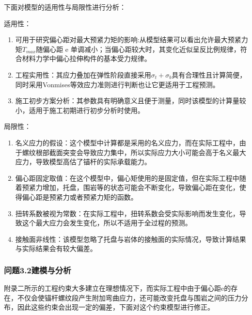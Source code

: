 \documentclass[UTF-8,a4paper,zihao=-4]{ctexart}
\begin{document}
下面对模型的适用性与局限性进行分析：

适用性：
\begin{enumerate}
    \item 可用于研究偏心距对最大预紧力矩的影响:从模型结果可以看出允许最大预紧力矩$T_{max}$随偏心距 e 单调减小；当偏心距较大时，其变化近似呈反比例规律，符合材料力学中偏心拉伸构件的基本受力规律。
    \item 工程实用性：其应力叠加在弹性阶段直接采用$\sigma_t+\sigma_b$具有合理性且计算简便，同时采用Vonmises等效应力准则进行判断也让它更适用于工程预测。
    \item 施工初步方案分析：其参数具有明确意义且便于测量，同时该模型的计算量较小，适用于施工初期进行初步分析时使用。
\end{enumerate}

局限性：
\begin{enumerate}
    \item 名义应力的假设：这个模型中计算都是采用的名义应力，而在实际工程中，由于螺纹根部截面突变会导致应力集中，所以实际应力大小可能会高于名义最大应力，导致模型高估了锚杆的实际承载能力。
    \item 偏心距固定取值：在这个模型中，偏心矩使用的是固定值，但在实际工程中随着预紧力增加，托盘，围岩等的状态可能会不断变化，导致偏心距在变化，使得偏心距是预紧力或者预紧力矩的函数。
    \item 扭转系数被视为常数：在实际工程中，扭转系数会受实际影响而发生变化，导致这个最大应力会发生变化，所以不适用于全过程的预测。
    \item 接触面非线性：该模型忽略了托盘与岩体的接触面的实际情况，导致计算结果与实际结果会有较大偏差。
\end{enumerate}

\subsubsection{问题3.2建模与分析}
附录二所示的工程约束大多建立在理想情况下，而实际工程中由于偏心距e的存在，不仅会使锚杆螺纹段产生附加弯曲应力，还可能改变托盘与围岩之间的压力分布，因此这些约束会出现一定的偏差，下面对这个约束模型进行修正。
\end{document}
